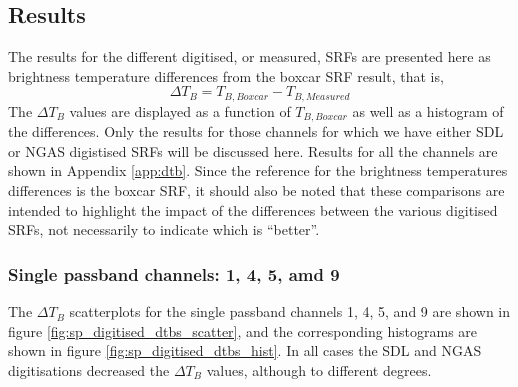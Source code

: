 \subsection{Results}
The results for the different digitised, or measured, SRFs are presented here as brightness temperature differences from the boxcar SRF result, that is,
\begin{equation}
  \Delta T_B = T_{B,Boxcar} - T_{B,Measured}
\end{equation}
The $\Delta T_B$ values are displayed as a function of $T_{B,Boxcar}$ as well as a histogram of the differences. Only the results for those channels for which we have either SDL or NGAS digistised SRFs will be discussed here. Results for all the channels are shown in Appendix \ref{app:dtb}. Since the reference for the brightness temperatures differences is the boxcar SRF, it should also be noted that these comparisons are intended to highlight the impact of the differences between the various digitised SRFs, not necessarily to indicate which is ``better''.

\subsubsection{Single passband channels: 1, 4, 5, amd 9}
The $\Delta T_B$ scatterplots for the single passband channels 1, 4, 5, and 9 are shown in figure \ref{fig:sp_digitised_dtbs_scatter}, and the corresponding histograms are shown in figure \ref{fig:sp_digitised_dtbs_hist}. In all cases the SDL and NGAS digitisations decreased the $\Delta T_B$ values, although to different degrees.

